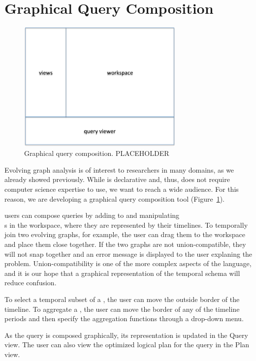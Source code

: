 \section{Graphical Query Composition}
\label{sec:gui}

\begin{figure}
\begin{center}
\includegraphics[width=3.2in]{figs/ui.pdf}
\caption{Graphical query composition. PLACEHOLDER}
\label{fig:ui}
\end{center}
\end{figure}

Evolving graph analysis is of interest to researchers in many domains,
as we already showed previously.  While \ql is declarative and, thus,
does not require computer science expertise to use, we want to reach a
wide audience.  For this reason, we are developing a graphical query
composition tool \qlui (Figure~\ref{fig:ui}).

\qlui users can compose queries by adding to and manipulating
\tg\\s in the workspace, where they are represented by their
timelines.  To temporally join two evolving graphs, for example, the
user can drag them to the workspace and place them close together.  If
the two graphs are not union-compatible, they will not snap together
and an error message is displayed to the user explaning the problem.
Union-compatibility is one of the more complex aspects of the
language, and it is our hope that a graphical representation of the
\tg temporal schema will reduce confusion.

To select a temporal subset of a \tg, the user can move the outside
border of the timeline.  To aggregate a \tg, the user can move the
border of any of the timeline periods and then specify the aggregation
functions through a drop-down menu.

As the query is composed graphically, its \ql representation is
updated in the Query view.  The user can also view the optimized
logical plan for the query in the Plan view.
